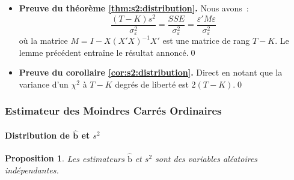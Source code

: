 \documentclass[10pt]{beamer}
\theoremstyle{plain}
\newtheorem{prop}{Proposition}
\begin{document}
\begin{notes}
\begin{itemize}
     \item \textbf{Preuve du théorème \ref{thm:s2:distribution}.} Nous avons~:
       \[
         \frac{(T-K)s^2}{\sigma_{\varepsilon}^2} = \frac{SSE}{\sigma_{\varepsilon}^2} = \frac{\varepsilon' M \varepsilon}{\sigma_{\varepsilon}^2}
       \]
       où la matrice $M = I - X(X'X)^{-1}X'$ est une matrice de rang $T-K$. Le lemme précédent entraîne le résultat annoncé.\qed\newline

     \item \textbf{Preuve du corollaire \ref{cor:s2:distribution}.} Direct en notant que la variance d'un $\chi^2$ à $T-K$ degrés de liberté est $2(T-K).$\qed

     \end{itemize}

\end{notes}


\begin{frame}
  \frametitle{Estimateur des Moindres Carrés Ordinaires}
  \framesubtitle {Distribution de $\hat{\mathbf b}$ et $s^2$}

  \begin{prop}\label{prop:bhat_perp_s2}
    Les estimateurs $\hat{\mathrm b}$ et $s^2$ sont des variables aléatoires indépendantes.
  \end{prop}

\end{frame}
\end{document}
